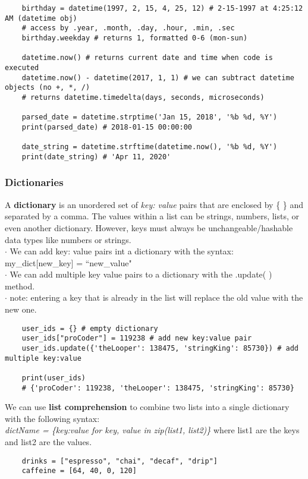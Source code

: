 \documentclass[11pt, a4paper]{article}
\begin{document}
\begin{spacing}{1.1}
\begin{lstlisting}
	birthday = datetime(1997, 2, 15, 4, 25, 12) # 2-15-1997 at 4:25:12 AM (datetime obj)
	# access by .year, .month, .day, .hour, .min, .sec 
	birthday.weekday # returns 1, formatted 0-6 (mon-sun)
	
	datetime.now() # returns current date and time when code is executed
	datetime.now() - datetime(2017, 1, 1) # we can subtract datetime objects (no +, *, /)
	# returns datetime.timedelta(days, seconds, microseconds)
	
	parsed_date = datetime.strptime('Jan 15, 2018', '%b %d, %Y')
	print(parsed_date) # 2018-01-15 00:00:00
	
	date_string = datetime.strftime(datetime.now(), '%b %d, %Y')  
	print(date_string) # 'Apr 11, 2020' \end{lstlisting} \newpage
	\subsubsection{Dictionaries}
	A \textbf{dictionary} is an unordered set of \textit{key: value} pairs that are enclosed by \{ \} and separated by a comma.
	The values within a list can be strings, numbers, lists, or even another dictionary. However, keys must always be unchangeable/hashable data types like numbers or strings.\\ 
	\hspace*{1.5mm} $\cdot$ We can add key: value pairs int a dictionary with the syntax: my\_dict[new\_key] = ``new\_value" \\
	\hspace*{1.5mm} $\cdot$ We can add multiple key value pairs to a dictionary with the .update( ) method. \\
	\hspace*{1.5mm} $\cdot$ note: entering a key that is already in the list will replace the old value with the new one.
	\begin{lstlisting}
	user_ids = {} # empty dictionary
	user_ids["proCoder"] = 119238 # add new key:value pair
	user_ids.update({'theLooper': 138475, 'stringKing': 85730}) # add multiple key:value
	
	print(user_ids) 
	# {'proCoder': 119238, 'theLooper': 138475, 'stringKing': 85730} \end{lstlisting}\vspace*{1mm}
	We can use \textbf{list comprehension} to combine two lists into a single dictionary with the following syntax: \\
	\textit{dictName = \{key:value for key, value in zip(list1, list2)\}} where list1 are the keys and list2 are the values.
	\begin{lstlisting}
	drinks = ["espresso", "chai", "decaf", "drip"]
	caffeine = [64, 40, 0, 120]
	

\end{lstlisting}
\end{spacing}
\end{document}
